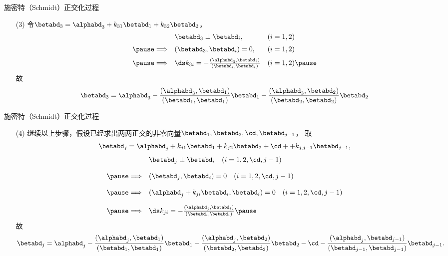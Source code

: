 \begin{frame}
  \begin{footnotesize}
    \begin{block}{施密特（Schmidt）正交化过程}
      
      \begin{itemize}
      \item[(3)] 令$\betabd_3=\alphabd_3+k_{31}\betabd_1+k_{32}\betabd_2$，\pause
        $$
        \begin{array}{rll}
          &\betabd_3\perp\betabd_i, & (i=1,2)\\[0.2cm] \pause
          \Longrightarrow&(\betabd_3,\betabd_i)=0, & (i=1,2)\\[0.2cm] \pause
          \Longrightarrow& \ds k_{3i}=-\frac{(\alphabd_3,\betabd_i)}{(\betabd_i,\betabd_i)} & (i=1,2) \pause
        \end{array}
        $$
        故
        $$
        \betabd_3=\alphabd_3-\frac{(\alphabd_3,\betabd_1)}{(\betabd_1,\betabd_1)}\betabd_1
        -\frac{(\alphabd_3,\betabd_2)}{(\betabd_2,\betabd_2)}\betabd_2
        $$
      \end{itemize}
    \end{block}

  \end{footnotesize}
\end{frame}


\begin{frame}
  \begin{footnotesize}
    \begin{block}{施密特（Schmidt）正交化过程}
      
      \begin{itemize}
      \item[(4)] 继续以上步骤，假设已经求出两两正交的非零向量$\betabd_1,\betabd_2,\cd,\betabd_{j-1}$，\pause
        取
        $$
        \betabd_j=\alphabd_j+k_{j1}\betabd_1+k_{j2}\betabd_2+\cd++k_{j,j-1}\betabd_{j-1},
        $$\pause
        $$
        \begin{array}{rl}
          & \betabd_j \perp \betabd_i\quad (i=1,2,\cd,j-1)\\[0.4cm] \pause
          \Longrightarrow &(\betabd_j,\betabd_i)=0 \quad (i=1,2,\cd,j-1)\\[0.4cm] \pause
          \Longrightarrow &(\alphabd_j+k_{ji}\betabd_i,\betabd_i)=0 \quad (i=1,2,\cd,j-1)\\[0.4cm] \pause
          \Longrightarrow& \ds k_{ji}=-\frac{(\alphabd_j,\betabd_i)}{(\betabd_i,\betabd_i)} \pause
        \end{array}
        $$
        故
        $$
        \betabd_j=\alphabd_j-\frac{(\alphabd_j,\betabd_1)}{(\betabd_1,\betabd_1)}\betabd_1
        -\frac{(\alphabd_j,\betabd_2)}{(\betabd_2,\betabd_2)}\betabd_2
        -\cd
        -\frac{(\alphabd_j,\betabd_{j-1})}{(\betabd_{j-1},\betabd_{j-1})}\betabd_{j-1}.
        $$
      \end{itemize}
    \end{block}
  \end{footnotesize}
\end{frame}


